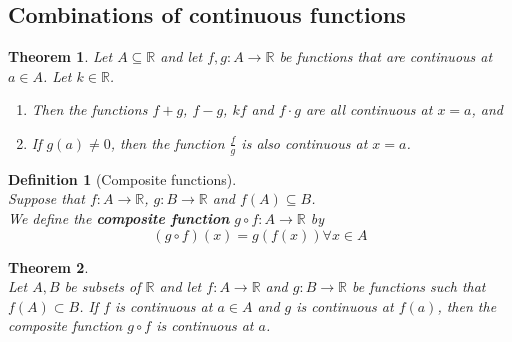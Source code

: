 \documentclass[12pt]{article}
\newtheorem{definition}{Definition}[section]
\newtheorem{theorem}{Theorem}[section]
\theoremstyle{definition}
\begin{document}
\subsection{Combinations of continuous functions}
\begin{theorem}\normalfont Let $A\subseteq \mathbb{R}$ and let $f,g:A\to \mathbb{R}$ be functions that are continuous at $a\in A$. Let $k\in\mathbb{R}$.
\begin{enumerate}
\item Then the functions $f+g$, $f-g$, $kf$ and $f\cdot g$ are all continuous at $x=a$, and
\item If $g(a)\neq 0$, then the function $\frac{f}{g}$ is also continuous at $x=a$.
\end{enumerate}
\end{theorem}
\begin{definition}[Composite functions]
\hfill\\\normalfont Suppose that $f:A\to\mathbb{R}$, $g: B\to\mathbb{R}$ and $f(A)\subseteq B$.\\
We define the \textbf{composite function} $g\circ f:A\to \mathbb{R}$ by
\[
(g\circ f)(x)=g(f(x))\forall x\in A
\]
\end{definition}
\begin{theorem}
\hfill\\\normalfont Let $A, B$ be subsets of $\mathbb{R}$ and let $f:A\to\mathbb{R}$ and $g:B\to\mathbb{R}$ be functions such that $f(A)\subset B$. If $f$ is continuous at $a\in A$ and $g$ is continuous at $f(a)$, then the composite function $g\circ f$ is continuous at $a$.
\end{theorem}
\end{document}
